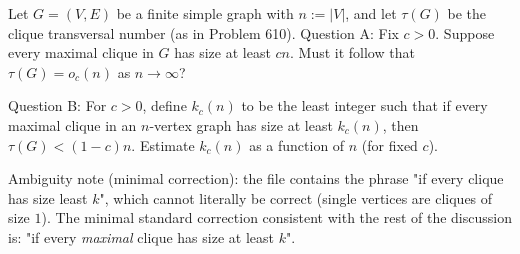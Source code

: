 Let $G=(V,E)$ be a finite simple graph with $n:=|V|$, and let $\tau(G)$ be the clique transversal number (as in Problem 610).
Question A: Fix $c>0$. Suppose every maximal clique in $G$ has size at least $cn$.
Must it follow that $\tau(G)=o_c(n)$ as $n\to\infty$?

Question B: For $c>0$, define $k_c(n)$ to be the least integer such that if every maximal clique in an $n$-vertex graph has size at least $k_c(n)$, then $\tau(G)<(1-c)n$.
Estimate $k_c(n)$ as a function of $n$ (for fixed $c$).

Ambiguity note (minimal correction): the file contains the phrase "if every clique has size least $k$", which cannot literally be correct (single vertices are cliques of size $1$).
The minimal standard correction consistent with the rest of the discussion is: "if every \emph{maximal} clique has size at least $k$".
